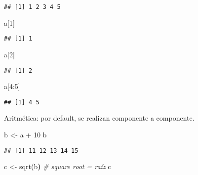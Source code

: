 \documentclass[]{article}
\newenvironment{Shaded}{\begin{snugshade}}{\end{snugshade}}
\newcommand{\DecValTok}[1]{\textcolor[rgb]{0.00,0.00,0.81}{{#1}}}
\newcommand{\StringTok}[1]{\textcolor[rgb]{0.31,0.60,0.02}{{#1}}}
\newcommand{\CommentTok}[1]{\textcolor[rgb]{0.56,0.35,0.01}{\textit{{#1}}}}
\newcommand{\ErrorTok}[1]{\textbf{{#1}}}
\newcommand{\NormalTok}[1]{{#1}}
\begin{document}
\begin{verbatim}
## [1] 1 2 3 4 5
\end{verbatim}

\begin{Shaded}
\begin{Highlighting}[]
\NormalTok{a[}\DecValTok{1}\NormalTok{]}
\end{Highlighting}
\end{Shaded}

\begin{verbatim}
## [1] 1
\end{verbatim}

\begin{Shaded}
\begin{Highlighting}[]
\NormalTok{a[}\DecValTok{2}\NormalTok{]}
\end{Highlighting}
\end{Shaded}

\begin{verbatim}
## [1] 2
\end{verbatim}

\begin{Shaded}
\begin{Highlighting}[]
\NormalTok{a[}\DecValTok{4}\NormalTok{:}\DecValTok{5}\NormalTok{]}
\end{Highlighting}
\end{Shaded}

\begin{verbatim}
## [1] 4 5
\end{verbatim}

Aritmética: por default, se realizan componente a componente.

\begin{Shaded}
\begin{Highlighting}[]
\NormalTok{b <-}\StringTok{ }\NormalTok{a +}\StringTok{ }\DecValTok{10}
\NormalTok{b}
\end{Highlighting}
\end{Shaded}

\begin{verbatim}
## [1] 11 12 13 14 15
\end{verbatim}

\begin{Shaded}
\begin{Highlighting}[]
\NormalTok{c <- sqrt(b}\ErrorTok{)} \CommentTok{# square root = raíz}
\NormalTok{c}
\end{Highlighting}
\end{Shaded}
\end{document}
